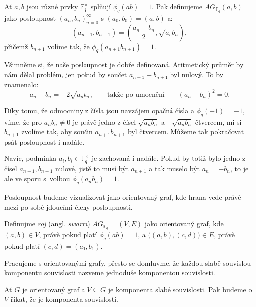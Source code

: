 \documentclass[12pt]{report}
\begin{document}
\begin{definice}
Ať $a,b$ jsou různé prvky $\mathbb{F}_q ^{\times}$ splňují $\phi_q (ab) = 1$. Pak definujeme $AG_{\mathbb{F}_q}(a,b)$ jako posloupnost $(a_n,b_n)_{n=0}^{\infty}$ s $(a_0,b_0) = (a,b)$ a:
\begin{equation*}
\left(a_{n+1},b_{n+1} \right) = \left(\frac{a_n+b_n}{2}, \sqrt{a_n b_n} \right),
\end{equation*}
přičemž $b_{n+1}$ volíme tak, že $\phi_q (a_{n+1} b_{n+1}) = 1$.
\end{definice}
Všimněme si, že naše posloupnost je dobře definovaná. Aritmetický průměr by nám dělal problém, jen pokud by součet $a_{n+1} + b_{n+1}$ byl nulový. To by znamenalo:
$$a_{n}+b_{n} = - 2\sqrt{a_n b_n}, \qquad \text{takže po umocnění} \qquad (a_n - b_n)^2 = 0.$$

Díky tomu, že odmocniny z čísla jsou navzájem opačná čísla a $\phi_q(-1)=-1$, víme, že pro $a_n b_n \neq 0$ je právě jedno z čísel $\sqrt{a_n b_n}$ a $-\sqrt{a_n b_n}$ čtvercem, mi si $b_{n+1}$ zvolíme tak, aby součin $a_{n+1} b_{n+1}$ byl čtvercem. Můžeme tak pokračovat psát posloupnost i nadále.

Navíc, podmínka $a_i,b_i \in \mathbb{F}_q ^{\times}$ je zachovaná i nadále. Pokud by totiž bylo jedno z čísel $a_{n+1},b_{n+1}$ nulové, jistě to musí být $a_{n+1}$ a tak muselo být $a_{n} = - b_n$, to je ale ve sporu s~volbou $\phi_q (a_n b_n) = 1$. 

Posloupnost budeme vizualizovat jako orientovaný graf, kde hrana vede právě mezi po sobě jdoucími členy posloupnosti.
\begin{definice}
Definujme \textit{roj} (angl. \textit{swarm}) $AG_{\mathbb{F}_q} = (V,E)$ jako orientovaný graf, kde $(a,b) \in V$, právě pokud platí $\phi_q(ab) = 1$, a $\big((a,b),(c,d)\big) \in E$, právě pokud platí $(c,d) = (a_1,b_1)$.
\end{definice}
Pracujeme s orientovanými grafy, přesto se domluvme, že každou slabě souvislou komponentu souvislosti nazveme jednoduše komponentou souvislosti.
\begin{umluva}
Ať $G$ je orientovaný graf a $V \subseteq G$ je komponenta slabé souvislosti. Pak budeme o $V$ říkat, že je komponenta souvislosti.
\end{umluva}
\end{document}
